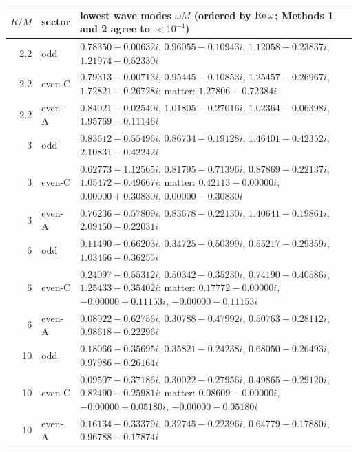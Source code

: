 \begin{tabular}{rlp{12cm}}\toprule
$R/M$ & sector & lowest wave modes $\omega M$ (ordered by ${\rm Re}\,\omega$; Methods 1 and 2 agree to $<10^{-4}$)\\\midrule
2.2 & odd & $0.78350-0.00632i$, $0.96055-0.10943i$, $1.12058-0.23837i$, $1.21974-0.52330i$ \\
2.2 & even-C & $0.79313-0.00713i$, $0.95445-0.10853i$, $1.25457-0.26967i$, $1.72821-0.26728i$; matter: $1.27806-0.72384i$ \\
2.2 & even-A & $0.84021-0.02540i$, $1.01805-0.27016i$, $1.02364-0.06398i$, $1.95769-0.11146i$ \\
3 & odd & $0.83612-0.55496i$, $0.86734-0.19128i$, $1.46401-0.42352i$, $2.10831-0.42242i$ \\
3 & even-C & $0.62773-1.12565i$, $0.81795-0.71396i$, $0.87869-0.22137i$, $1.05472-0.49667i$; matter: $0.42113-0.00000i$, $0.00000+0.30830i$, $0.00000-0.30830i$ \\
3 & even-A & $0.76236-0.57809i$, $0.83678-0.22130i$, $1.40641-0.19861i$, $2.09450-0.22031i$ \\
6 & odd & $0.11490-0.66203i$, $0.34725-0.50399i$, $0.55217-0.29359i$, $1.03466-0.36255i$ \\
6 & even-C & $0.24097-0.55312i$, $0.50342-0.35230i$, $0.74190-0.40586i$, $1.25433-0.35402i$; matter: $0.17772-0.00000i$, $-0.00000+0.11153i$, $-0.00000-0.11153i$ \\
6 & even-A & $0.08922-0.62756i$, $0.30788-0.47992i$, $0.50763-0.28112i$, $0.98618-0.22296i$ \\
10 & odd & $0.18066-0.35695i$, $0.35821-0.24238i$, $0.68050-0.26493i$, $0.97986-0.26164i$ \\
10 & even-C & $0.09507-0.37186i$, $0.30022-0.27956i$, $0.49865-0.29120i$, $0.82490-0.25981i$; matter: $0.08609-0.00000i$, $-0.00000+0.05180i$, $-0.00000-0.05180i$ \\
10 & even-A & $0.16134-0.33379i$, $0.32745-0.22396i$, $0.64779-0.17880i$, $0.96788-0.17874i$ \\
\bottomrule\end{tabular}
